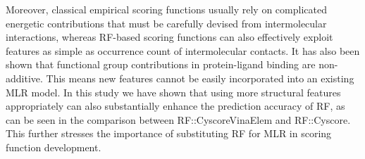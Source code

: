 \documentclass[linenumbers]{bmcart}
\begin{document}
Moreover, classical empirical scoring functions usually rely on complicated energetic contributions that must be carefully devised from intermolecular interactions, whereas RF-based scoring functions can also effectively exploit features as simple as occurrence count of intermolecular contacts. It has also been shown that functional group contributions in protein-ligand binding are non-additive. This means new features cannot be easily incorporated into an existing MLR model. In this study we have shown that using more structural features appropriately can also substantially enhance the prediction accuracy of RF, as can be seen in the comparison between RF::CyscoreVinaElem and RF::Cyscore. This further stresses the importance of substituting RF for MLR in scoring function development.

\end{document}
